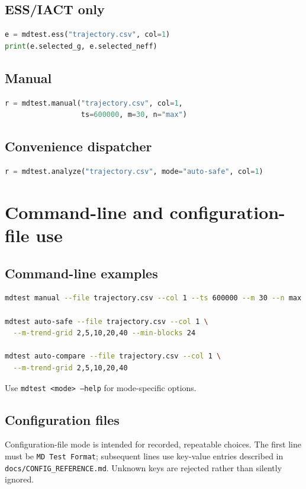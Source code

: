 \documentclass[11pt,oneside]{report}
\begin{document}
\section{ESS/IACT only}
\begin{lstlisting}[language=Python]
e = mdtest.ess("trajectory.csv", col=1)
print(e.selected_g, e.selected_neff)
\end{lstlisting}

\section{Manual}
\begin{lstlisting}[language=Python]
r = mdtest.manual("trajectory.csv", col=1,
                  ts=600000, m=30, n="max")
\end{lstlisting}

\section{Convenience dispatcher}
\begin{lstlisting}[language=Python]
r = mdtest.analyze("trajectory.csv", mode="auto-safe", col=1)
\end{lstlisting}

\chapter{Command-line and configuration-file use}
\section{Command-line examples}
\begin{lstlisting}[language=bash]
mdtest manual --file trajectory.csv --col 1 --ts 600000 --m 30 --n max

mdtest auto-safe --file trajectory.csv --col 1 \
  --m-trend-grid 2,5,10,20,40 --min-blocks 24

mdtest auto-compare --file trajectory.csv --col 1 \
  --m-trend-grid 2,5,10,20,40
\end{lstlisting}
Use \texttt{mdtest <mode> --help} for mode-specific options.

\section{Configuration files}
Configuration-file mode is intended for recorded, repeatable choices. The first line must be \texttt{MD Test Format}; subsequent lines use key-value entries described in \texttt{docs/CONFIG\_REFERENCE.md}. Unknown keys are rejected rather than silently ignored.
\end{document}
